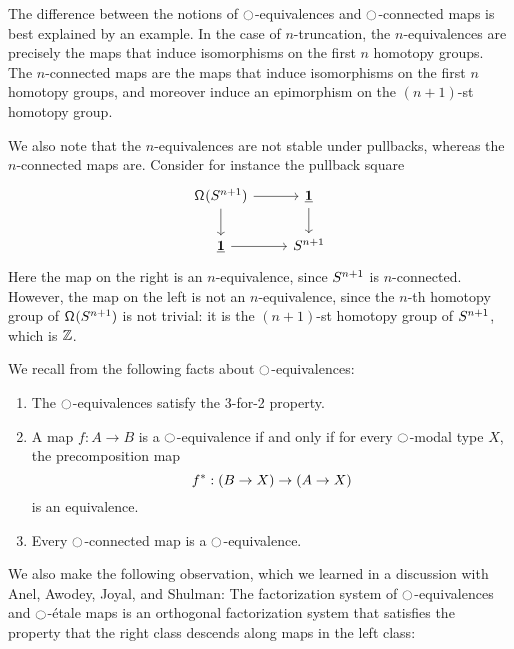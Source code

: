 \documentclass[9pt,twosided]{amsart}
\begin{document}
\begin{rmk}
The difference between the notions of ${\ocircle}$-equivalences and ${\ocircle}$-connected maps is best explained by an example. In the case of $n$-truncation, the $n$-equivalences are precisely the maps that induce isomorphisms on the first $n$ homotopy groups. The $n$-connected maps are the maps that induce isomorphisms on the first $n$ homotopy groups, and moreover induce an epimorphism on the $(n+1)$-st homotopy group. 

We also note that the $n$-equivalences are not stable under pullbacks, whereas the $n$-connected maps are. Consider for instance the pullback square
\begin{equation*}
\begin{tikzcd}
\loopspace {\sphere{n+1}} \arrow[r] \arrow[d] & \unit \arrow[d] \\
\unit\arrow[r] & \sphere{n+1}
\end{tikzcd}
\end{equation*}
Here the map on the right is an $n$-equivalence, since $S^{n+1}$ is $n$-connected. However, the map on the left is not an $n$-equivalence, since the $n$-th homotopy group of $\mathsf{\Omega}^{}(S^{n+1})$ is not trivial: it is the $(n+1)$-st homotopy group of $S^{n+1}$, which is $\mathbb{Z}$.
\end{rmk}
We recall from \cite{CORS} the following facts about ${\ocircle}$-equivalences:
\begin{prp}
  \label{lem:3for2_mequiv}\label{cor:mequiv_mconn}
  \begin{enumerate}
  \item The ${\ocircle}$-equivalences satisfy the 3-for-2 property.
  \item A map $f:A\to B$ is a ${\ocircle}$-equivalence if and only if for every ${\ocircle}$-modal type $X$, the precomposition map
    \begin{equation*}
      f^{\ast} : (B \to X) \to (A \to X)
    \end{equation*}
    is an equivalence.
  \item
    Every ${\ocircle}$-connected map is a ${\ocircle}$-equivalence.
  \end{enumerate}
\end{prp}

We also make the following observation, which we learned in a discussion with Anel, Awodey, Joyal, and Shulman: The factorization system of ${\ocircle}$-equivalences and ${\ocircle}$-\'etale maps is an orthogonal factorization system that satisfies the property that the right class descends along maps in the left class:
\end{document}
